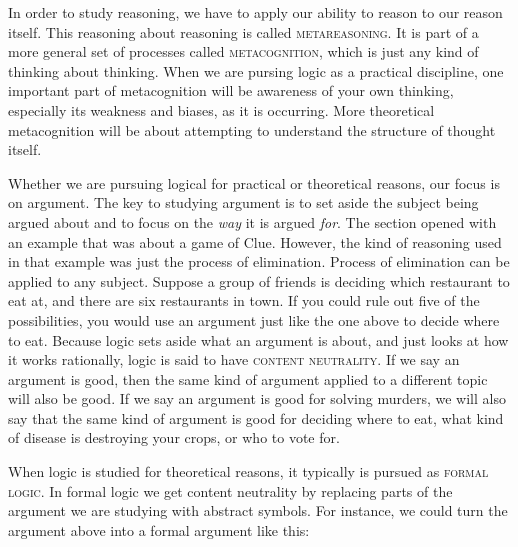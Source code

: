 In order to study reasoning, we have to apply our ability to reason to our reason itself. This reasoning about reasoning is called \textsc{\gls{metareasoning}}\label{def:metareasoning}. It is part of a more general set of processes called \textsc{\gls{metacognition}}\label{def:metacognition}, which is just any kind of thinking about thinking. When we are pursing logic as a practical discipline, one important part of metacognition will be awareness of your own thinking, especially its weakness and biases, as it is occurring. More theoretical metacognition will be about attempting to understand the structure of thought itself.

Whether we are pursuing logical for practical or theoretical reasons, our focus is on argument. The key to studying argument is to set aside the subject being argued about and to focus on the \emph{way} it is argued \emph{for}. The section opened with an example that was about a game of Clue. However, the kind of reasoning used in that example was just the process of elimination. Process of elimination can be applied to any subject. Suppose a group of friends is deciding which restaurant to eat at, and there are six restaurants in town. If you could rule out five of the possibilities, you would use an argument just like the one above to decide where to eat. Because logic sets aside what an argument is about, and just looks at how it works rationally, logic is said to have \textsc{\gls{content neutrality}}. \label{def:content_neutrality} If we say an argument is good, then the same kind of argument applied to a different topic will also be good.  If we say an argument is good for solving murders, we will also say that the same kind of argument is good for deciding where to eat, what kind of disease is destroying your crops, or who to vote for.

When logic is studied for theoretical reasons, it typically is pursued as \textsc{\gls{formal logic}}. \label{def:formal_logic} In formal logic we get content neutrality by replacing parts of the argument we are studying with abstract symbols. For instance, we could turn the argument above into a formal argument like this:

\begin{figure}[!ht]
\begin{kormanize}
\end{kormanize}
\label{argClueformal}
\end{figure}

